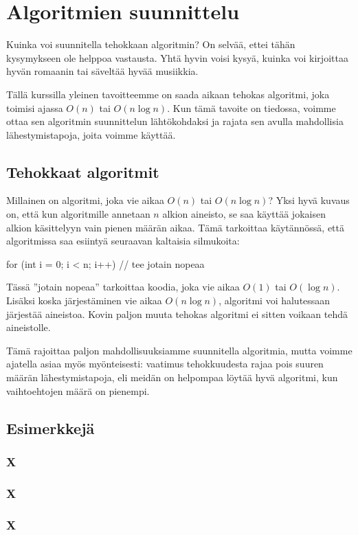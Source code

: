 \chapter{Algoritmien suunnittelu}

Kuinka voi suunnitella tehokkaan algoritmin?
On selvää, ettei tähän kysymykseen ole helppoa vastausta.
Yhtä hyvin voisi kysyä, kuinka voi kirjoittaa hyvän romaanin
tai säveltää hyvää musiikkia.

Tällä kurssilla yleinen tavoitteemme on
saada aikaan tehokas algoritmi, joka toimisi ajassa $O(n)$ tai $O(n \log n)$.
Kun tämä tavoite on tiedossa, voimme ottaa sen algoritmin
suunnittelun lähtökohdaksi ja rajata sen avulla mahdollisia
lähestymistapoja, joita voimme käyttää.

\section{Tehokkaat algoritmit}

Millainen on algoritmi, joka vie aikaa $O(n)$ tai $O(n \log n)$?
Yksi hyvä kuvaus on,
että kun algoritmille annetaan $n$ alkion aineisto,
se saa käyttää jokaisen alkion käsittelyyn
vain pienen määrän aikaa.
Tämä tarkoittaa käytännössä, että algoritmissa saa
esiintyä seuraavan kaltaisia silmukoita:

\begin{code}
for (int i = 0; i < n; i++) {
    // tee jotain nopeaa
}
\end{code}

Tässä ''jotain nopeaa'' tarkoittaa koodia, joka vie aikaa
$O(1)$ tai $O(\log n)$.
Lisäksi koska järjestäminen vie aikaa $O(n \log n)$,
algoritmi voi halutessaan järjestää aineistoa.
Kovin paljon muuta tehokas algoritmi ei sitten voikaan tehdä
aineistolle.

Tämä rajoittaa paljon mahdollisuuksiamme suunnitella algoritmia,
mutta voimme ajatella asiaa myös myönteisesti:
vaatimus tehokkuudesta rajaa pois suuren määrän lähestymistapoja,
eli meidän on helpompaa löytää hyvä algoritmi,
kun vaihtoehtojen määrä on pienempi.

\section{Esimerkkejä}

\subsection{X}

\subsection{X}

\subsection{X}
